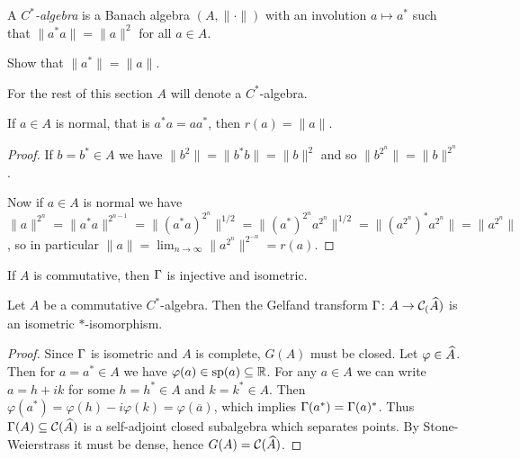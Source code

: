 \begin{definition}
 A \emph{$C^\ast$-algebra} is a Banach algebra $(A,\|\cdot\|)$ with an involution $a\mapsto a^\ast$ such that $\|a^\ast a\|=\|a\|^2$ for all $a\in A$.
\end{definition}
\begin{exercise}
 Show that $\|a^\ast\|=\|a\|$.
\end{exercise}

\noindent For the rest of this section $A$ will denote a $C^\ast$-algebra.

\begin{proposition}
 If $a\in A$ is normal, that is $a^\ast a=aa^\ast$, then $r(a)=\|a\|$.
\end{proposition}
\begin{proof}
 If $b=b^\ast\in A$ we have $\|b^2\|=\|b^\ast b\|=\|b\|^2$ and so $\|b^{2^n}\|=\|b\|^{2^n}$.
 
 \noindent Now if $a\in A$ is normal we have $\|a\|^{2^n}=\|a^\ast a\|^{2^{n-1}}=\|(a^\ast a)^{2^n}\|^{1/2}=\|(a^\ast)^{2^n}a^{2^n}\|^{1/2}=\|(a^{2^n})^\ast a^{2^n}\|=\|a^{2^n}\|$, so in particular $\|a\|=\lim_{n\to\infty}\|a^{2^n}\|^{2^{-n}}=r(a)$.
\end{proof}

\begin{corollary}
 If $A$ is commutative, then $\Gamma$ is injective and isometric.
\end{corollary}
\begin{theorem}
 Let $A$ be a commutative $C^\ast$-algebra. Then the Gelfand transform $\Gamma\colon A\to\mathcal{C}_(\widehat{A})$ is an isometric $\ast$-isomorphism.
\end{theorem}
\begin{proof}
 Since $\Gamma$ is isometric and $A$ is complete, $G(A)$ must be closed. Let $\varphi\in\widehat{A}$. Then for $a=a^\ast\in A$ we have $\varphi(a)\in\mathrm{sp}(a)\subseteq\mathbb{R}$. For any $a\in A$ we can write $a=h+ik$ for some $h=h^\ast\in A$ and $k=k^\ast\in A$. Then $\varphi(a^\ast)=\varphi(h)-i\varphi(k)=\varphi(\overline{a})$, which implies $\Gamma(a^\ast)=\Gamma(a)^\ast$. Thus $\Gamma(A)\subseteq\mathcal{C}(\widehat{A})$ is a self-adjoint closed subalgebra which separates points. By Stone-Weierstrass it must be dense, hence $G(A)=\mathcal{C}(\widehat{A})$. 
\end{proof}

